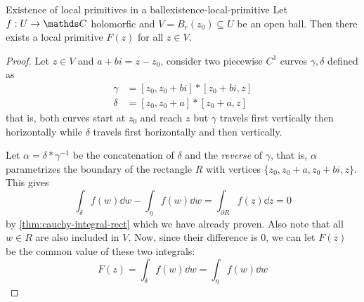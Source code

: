 \documentclass[12pt]{extarticle}
\begin{document}
\begin{proposition}{Existence of local primitives in a ball}{existence-local-primitive}
	Let $f: U \to \C$ holomorfic and $V = B_r(z_0) \subseteq U$ be an open ball.
	Then there exists a local primitive $F(z)$ for all $z \in V$.
\end{proposition}

\begin{proof}
	Let $z \in V$ and $a + bi = z - z_0$, consider two piecewise $C^1$ curves $\gamma, \delta$
	defined as
	\begin{align}
		\gamma & = [z_0, z_0 + bi] * [z_0 + bi, z] \\
		\delta & = [z_0, z_0 + a] * [z_0 + a, z]
	\end{align}
	that is, both curves start at $z_0$ and reach $z$ but
	$\gamma$ travels first vertically then horizontally while
	$\delta$ travels first horizontally and then vertically.

	Let $\alpha = \delta * \gamma^{-1}$ be the concatenation of $\delta$ and the \emph{reverse} of
	$\gamma$, that is, $\alpha$ parametrizes the boundary of the rectangle $R$ with vertices
	$\{z_0, z_0 + a, z_0 + bi, z\}$.
	This gives
	\begin{equation}
		\int_\delta f(w) \dd w - \int_\eta f(w) \dd w = \int_{\partial R} f(z) \dd z = 0
	\end{equation}
	by \cref{thm:cauchy-integral-rect} which we have already proven. Also note that all $w \in R$ are
	also included in $V$.
	Now, since their difference is $0$, we can let $F(z)$ be the common value of these two integrals:
	\begin{equation}
		F(z) = \int_\delta f(w) \dd w = \int_\eta f(w) \dd w
	\end{equation}


\end{proof}
\end{document}

